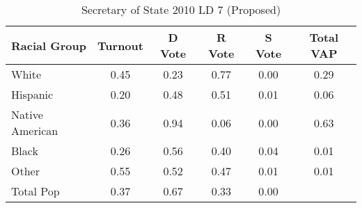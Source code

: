\begin{table}[htb]
\begin{center}
\caption{Secretary of State 2010 LD 7 (Proposed)}
\label{sos10_vap_ld_7}
\begin{tabular}{lccccc}
  \hline
Racial Group & Turnout & D Vote & R Vote & S Vote & Total VAP \\ 
  \hline
White & 0.45 & 0.23 & 0.77 & 0.00 & 0.29 \\ 
  Hispanic & 0.20 & 0.48 & 0.51 & 0.01 & 0.06 \\ 
  Native American & 0.36 & 0.94 & 0.06 & 0.00 & 0.63 \\ 
  Black & 0.26 & 0.56 & 0.40 & 0.04 & 0.01 \\ 
  Other & 0.55 & 0.52 & 0.47 & 0.01 & 0.01 \\ 
  Total Pop & 0.37 & 0.67 & 0.33 & 0.00 &  \\ 
   \hline
\end{tabular}
\end{center}
\end{table}
